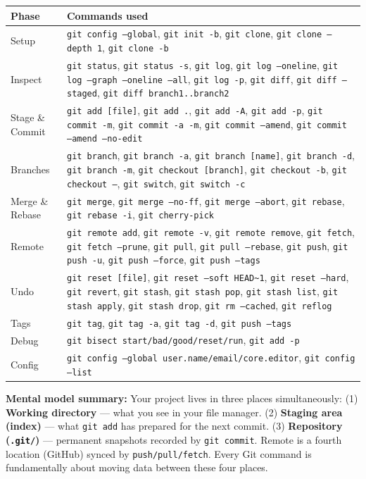 \documentclass[10pt,a4paper]{article}
\newenvironment{notebox}{%
  \begin{mdframed}[backgroundcolor=notebg, linewidth=0.6pt,
    innerleftmargin=6pt, innerrightmargin=6pt,
    innertopmargin=3pt, innerbottommargin=3pt]%
  \small
}{%
  \end{mdframed}%
}
\newcommand{\cmd}[1]{\texttt{\small #1}}
\begin{document}
\begin{tabular}{@{}p{4.5cm}p{10cm}@{}}
\toprule
\textbf{Phase} & \textbf{Commands used} \\
\midrule
Setup & \cmd{git config --global}, \cmd{git init -b}, \cmd{git clone}, \cmd{git clone --depth 1}, \cmd{git clone -b} \\[2pt]
Inspect & \cmd{git status}, \cmd{git status -s}, \cmd{git log}, \cmd{git log --oneline}, \cmd{git log --graph --oneline --all}, \cmd{git log -p}, \cmd{git diff}, \cmd{git diff --staged}, \cmd{git diff branch1..branch2} \\[2pt]
Stage \& Commit & \cmd{git add [file]}, \cmd{git add .}, \cmd{git add -A}, \cmd{git add -p}, \cmd{git commit -m}, \cmd{git commit -a -m}, \cmd{git commit --amend}, \cmd{git commit --amend --no-edit} \\[2pt]
Branches & \cmd{git branch}, \cmd{git branch -a}, \cmd{git branch [name]}, \cmd{git branch -d}, \cmd{git branch -m}, \cmd{git checkout [branch]}, \cmd{git checkout -b}, \cmd{git checkout --}, \cmd{git switch}, \cmd{git switch -c} \\[2pt]
Merge \& Rebase & \cmd{git merge}, \cmd{git merge --no-ff}, \cmd{git merge --abort}, \cmd{git rebase}, \cmd{git rebase -i}, \cmd{git cherry-pick} \\[2pt]
Remote & \cmd{git remote add}, \cmd{git remote -v}, \cmd{git remote remove}, \cmd{git fetch}, \cmd{git fetch --prune}, \cmd{git pull}, \cmd{git pull --rebase}, \cmd{git push}, \cmd{git push -u}, \cmd{git push --force}, \cmd{git push --tags} \\[2pt]
Undo & \cmd{git reset [file]}, \cmd{git reset --soft HEAD\textasciitilde1}, \cmd{git reset --hard}, \cmd{git revert}, \cmd{git stash}, \cmd{git stash pop}, \cmd{git stash list}, \cmd{git stash apply}, \cmd{git stash drop}, \cmd{git rm --cached}, \cmd{git reflog} \\[2pt]
Tags & \cmd{git tag}, \cmd{git tag -a}, \cmd{git tag -d}, \cmd{git push --tags} \\[2pt]
Debug & \cmd{git bisect start/bad/good/reset/run}, \cmd{git add -p} \\[2pt]
Config & \cmd{git config --global user.name/email/core.editor}, \cmd{git config --list} \\
\bottomrule
\end{tabular}

\vspace{6pt}
\begin{notebox}
\textbf{Mental model summary:}
Your project lives in three places simultaneously:
(1) \textbf{Working directory} --- what you see in your file manager.
(2) \textbf{Staging area (index)} --- what \cmd{git add} has prepared for the next commit.
(3) \textbf{Repository (\texttt{.git/})} --- permanent snapshots recorded by \cmd{git commit}.
Remote is a fourth location (GitHub) synced by \cmd{push/pull/fetch}.
Every Git command is fundamentally about moving data between these four places.
\end{notebox}
\end{document}
